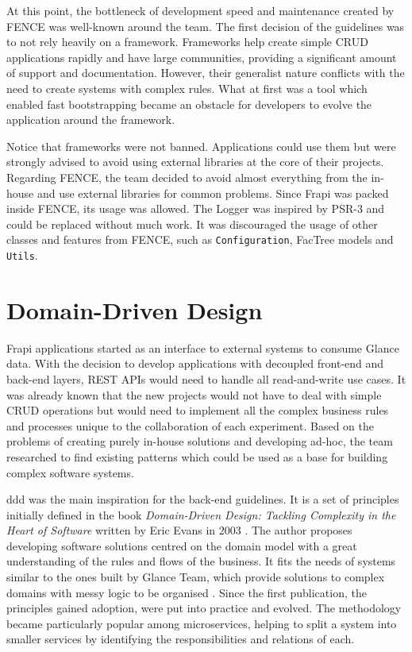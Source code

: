 At this point, the bottleneck of development speed and maintenance created by FENCE was well-known around the team. The first decision of the guidelines was to not rely heavily on a framework. Frameworks help create simple CRUD applications rapidly and have large communities, providing a significant amount of support and documentation. However, their generalist nature conflicts with the need to create systems with complex rules. What at first was a tool which enabled fast bootstrapping became an obstacle for developers to evolve the application around the framework.

Notice that frameworks were not banned. Applications could use them but were strongly advised to avoid using external libraries at the core of their projects. Regarding FENCE, the team decided to avoid almost everything from the in-house and use external libraries for common problems. Since Frapi was packed inside FENCE, its usage was allowed. The Logger was inspired by PSR-3 \cite{psr-3} and could be replaced without much work. It was discouraged the usage of other classes and features from FENCE, such as \texttt{Configuration}, FacTree models and \texttt{Utils}.

\section{Domain-Driven Design}
\label{sec:ddd}

Frapi applications started as an interface to external systems to consume Glance data. With the decision to develop applications with decoupled front-end and back-end layers, REST APIs would need to handle all read-and-write use cases. It was already known that the new projects would not have to deal with simple CRUD operations but would need to implement all the complex business rules and processes unique to the collaboration of each experiment. Based on the problems of creating purely in-house solutions and developing ad-hoc, the team researched to find existing patterns which could be used as a base for building complex software systems.

\acrfull{ddd} was the main inspiration for the back-end guidelines. It is a set of principles initially defined in the book \textit{Domain-Driven Design: Tackling Complexity in the Heart of Software} written by Eric Evans in 2003 \cite{ddd-blue-book}. The author proposes developing software solutions centred on the domain model with a great understanding of the rules and flows of the business. It fits the needs of systems similar to the ones built by Glance Team, which provide solutions to complex domains with messy logic to be organised \cite{ddd-martin-folwer}. Since the first publication, the principles gained adoption, were put into practice and evolved. The methodology became particularly popular among microservices, helping to split a system into smaller services by identifying the responsibilities and relations of each.

